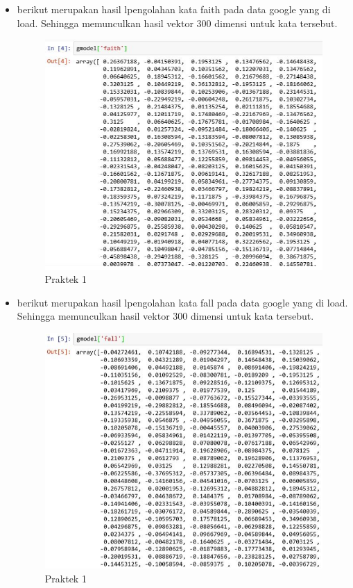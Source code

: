 \begin{enumerate}
\begin{itemize}
\item berikut merupakan hasil lpengolahan kata faith pada data google yang di load. Sehingga memunculkan hasil vektor 300 dimensi untuk kata tersebut.

\begin{figure}[ht]
\centering
\includegraphics[scale=0.6]{figures/1174008/5/2,1,2.PNG}
\caption{Praktek 1}
\end{figure}

\item berikut merupakan hasil lpengolahan kata fall pada data google yang di load. Sehingga memunculkan hasil vektor 300 dimensi untuk kata tersebut.

\begin{figure}[ht]
\centering
\includegraphics[scale=0.6]{figures/1174008/5/2,1,3.PNG}
\caption{Praktek 1}
\end{figure}


\end{itemize}
\end{enumerate}
